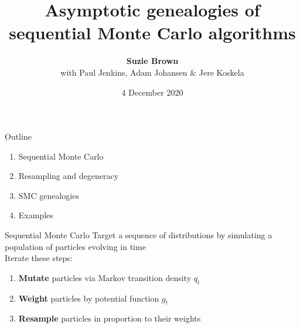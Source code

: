 \documentclass[aspectratio=169]{beamer}
\title[Genealogies of SMC Algorithms]{Asymptotic genealogies of sequential Monte Carlo algorithms}
\author[Suzie Brown]{\textbf{Suzie Brown} \\ with Paul Jenkins, Adam Johansen \& Jere Koskela}
\date{4 December 2020}
\theoremstyle{definition}
\begin{document}
\begin{frame}
\maketitle
\end{frame}

\begin{frame}{Outline}
\begin{enumerate}
\item Sequential Monte Carlo
\item Resampling and degeneracy
\item SMC genealogies
\item Examples
\end{enumerate}
\end{frame}


\begin{frame}{Sequential Monte Carlo}
Target a sequence of distributions by simulating a population of particles evolving in time\\[10pt]
Iterate these steps:
\begin{enumerate}
\item \textbf{Mutate} particles via Markov transition density $q_t$
\item \textbf{Weight} particles by potential function $g_t$
\item \textbf{Resample} particles in proportion to their weights
\end{enumerate}
\end{frame}
\end{document}
